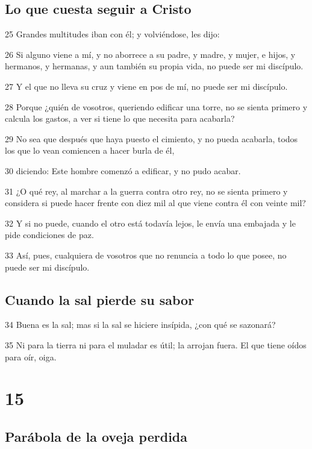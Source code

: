\section*{Lo que cuesta seguir a Cristo}

\par 25 Grandes multitudes iban con él; y volviéndose, les dijo:
\par 26 Si alguno viene a mí, y no aborrece a su padre, y madre, y mujer, e hijos, y hermanos, y hermanas, y aun también su propia vida, no puede ser mi discípulo.
\par 27 Y el que no lleva su cruz y viene en pos de mí, no puede ser mi discípulo.
\par 28 Porque ¿quién de vosotros, queriendo edificar una torre, no se sienta primero y calcula los gastos, a ver si tiene lo que necesita para acabarla?
\par 29 No sea que después que haya puesto el cimiento, y no pueda acabarla, todos los que lo vean comiencen a hacer burla de él,
\par 30 diciendo: Este hombre comenzó a edificar, y no pudo acabar.
\par 31 ¿O qué rey, al marchar a la guerra contra otro rey, no se sienta primero y considera si puede hacer frente con diez mil al que viene contra él con veinte mil?
\par 32 Y si no puede, cuando el otro está todavía lejos, le envía una embajada y le pide condiciones de paz.
\par 33 Así, pues, cualquiera de vosotros que no renuncia a todo lo que posee, no puede ser mi discípulo.

\section*{Cuando la sal pierde su sabor}

\par 34 Buena es la sal; mas si la sal se hiciere insípida, ¿con qué se sazonará?
\par 35 Ni para la tierra ni para el muladar es útil; la arrojan fuera. El que tiene oídos para oír, oiga.

\chapter{15}

\section*{Parábola de la oveja perdida}

